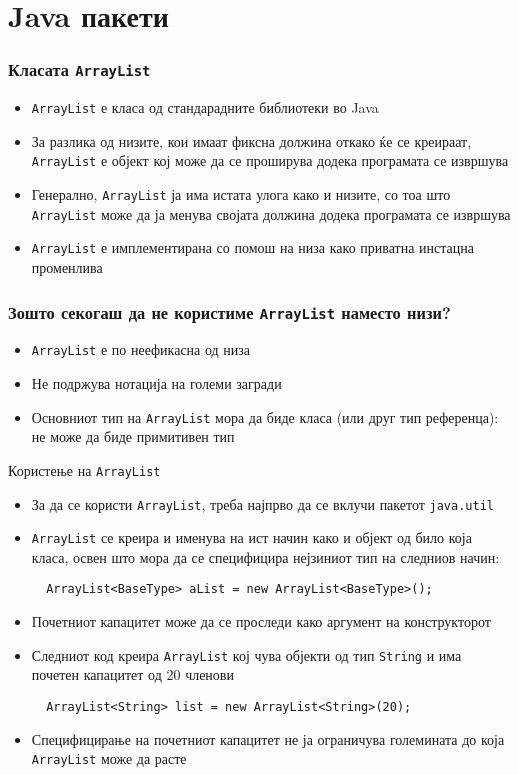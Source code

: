 \section{Java пакети}

\begin{frame}\frametitle{Класата \texttt{ArrayList}}
\begin{itemize}
\item
  \texttt{ArrayList} е класа од стандарадните библиотеки во Java
  \item За разлика од низите, кои имаат фиксна должина откако ќе се креираат,
  \texttt{ArrayList} е објект кој може да се проширува додека програмата се
  извршува
	\item Генерално, \texttt{ArrayList} ја има истата улога како и низите, со тоа
	што \texttt{ArrayList} може да ја менува својата должина додека програмата се
	извршува
	\item \texttt{ArrayList} е имплементирана со помош на низа како приватна
	инстацна променлива
\end{itemize}
\end{frame}

\begin{frame}\frametitle{Зошто секогаш да не користиме \texttt{ArrayList}
наместо низи?}

\begin{itemize}
\item
  \texttt{ArrayList} е по неефикасна од низа
  \item Не подржува нотација на големи загради
  \item Основниот тип на \texttt{ArrayList} мора да биде класа (или друг тип
  референца): не може да биде примитивен тип
\end{itemize}
\end{frame}

\begin{frame}[fragile]{Користење на \texttt{ArrayList}}
\begin{itemize}
  \item За да се користи \texttt{ArrayList}, треба најпрво да се вклучи пакетот
  \texttt{java.util}
  \item \texttt{ArrayList} се креира и именува на ист начин како и објект од
  било која класа, освен што мора да се специфицира нејзиниот тип на следниов
  начин:
  \begin{lstlisting}
  ArrayList<BaseType> aList = new ArrayList<BaseType>();
  \end{lstlisting}
  \item Почетниот капацитет може да се проследи како аргумент на конструкторот
  \item Следниот код креира \texttt{ArrayList} кој чува објекти од тип
  \texttt{String} и има почетен капацитет  од 20 членови
  \begin{lstlisting}
  ArrayList<String> list = new ArrayList<String>(20);
  \end{lstlisting} 
  \item Специфицирање на почетниот капацитет не ја ограничува
  големината до која \texttt{ArrayList} може да расте
\end{itemize}
\end{frame}

